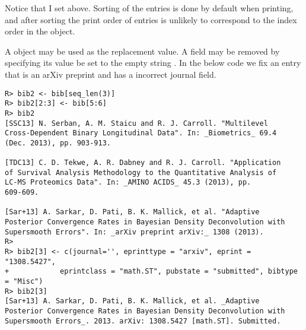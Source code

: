 \documentclass[article]{jss}\usepackage[]{graphicx}\usepackage[]{color}
\makeatletter
\newenvironment{kframe}{%
 \def\at@end@of@kframe{}%
 \ifinner\ifhmode%
  \def\at@end@of@kframe{\end{minipage}}%
  \begin{minipage}{\columnwidth}%
 \fi\fi%
 \def\FrameCommand##1{\hskip\@totalleftmargin \hskip-\fboxsep
 \colorbox{shadecolor}{##1}\hskip-\fboxsep
     \hskip-\linewidth \hskip-\@totalleftmargin \hskip\columnwidth}%
 \MakeFramed {\advance\hsize-\width
   \@totalleftmargin\z@ \linewidth\hsize
   \@setminipage}}%
 {\par\unskip\endMakeFramed%
 \at@end@of@kframe}
\newenvironment{knitrout}{}{} %
\makeatother
\begin{document}
Notice that I set  above.  Sorting of the entries is done by default when printing, and after sorting the print order of entries is unlikely to correspond to the index order in the  object.  

A  object may be used as the replacement value.  A field may be removed by specifying its value be set to the empty string .  In the below code we fix an entry that is an arXiv preprint and has a incorrect journal field.
\begin{knitrout}
\color{fgcolor}\begin{kframe}
\begin{verbatim}
R> bib2 <- bib[seq_len(3)]
R> bib2[2:3] <- bib[5:6]
R> bib2
[SSC13] N. Serban, A. M. Staicu and R. J. Carroll. "Multilevel
Cross-Dependent Binary Longitudinal Data". In: _Biometrics_ 69.4
(Dec. 2013), pp. 903-913.

[TDC13] C. D. Tekwe, A. R. Dabney and R. J. Carroll. "Application
of Survival Analysis Methodology to the Quantitative Analysis of
LC-MS Proteomics Data". In: _AMINO ACIDS_ 45.3 (2013), pp.
609-609.

[Sar+13] A. Sarkar, D. Pati, B. K. Mallick, et al. "Adaptive
Posterior Convergence Rates in Bayesian Density Deconvolution with
Supersmooth Errors". In: _arXiv preprint arXiv:_ 1308 (2013).
R> 
R> bib2[3] <- c(journal='', eprinttype = "arxiv", eprint = "1308.5427", 
+            eprintclass = "math.ST", pubstate = "submitted", bibtype = "Misc")
R> bib2[3]
[Sar+13] A. Sarkar, D. Pati, B. K. Mallick, et al. _Adaptive
Posterior Convergence Rates in Bayesian Density Deconvolution with
Supersmooth Errors_. 2013. arXiv: 1308.5427 [math.ST]. Submitted.
\end{verbatim}
\end{kframe}
\end{knitrout}
\end{document}
